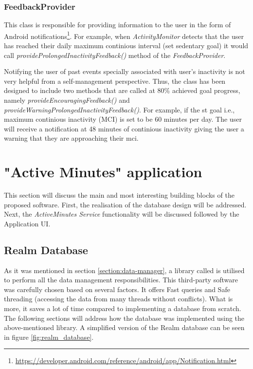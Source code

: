     \subsubsection{FeedbackProvider}
    \label{section:feedback-provider}
    This class is responsible for providing information to the user in the form of Android notifications\footnote{\url{https://developer.android.com/reference/android/app/Notification.html}}. For example, when \textit{ActivityMonitor} detects that the user has reached their daily maximum continious interval (set sedentary goal) it would call \textit{provideProlongedInactivityFeedback()} method of the \textit{FeedbackProvider}.
    
    Notifying the user of past events specially associated with user's inactivity is not very helpful from a self-management perspective. Thus, the class has been designed to include two methods that are called at 80\% achieved goal progress, namely \textit{provideEncouragingFeedback()} and \textit{provideWarningProlongedInactivityFeedback()}. For example, if the \gls{st} goal i.e., maximum continious inactivity (MCI) is set to be 60 minutes per day. The user will receive a notification at 48 minutes of continious inactivity giving the user a warning that they are approaching their \gls{mci}. 

\section{"Active Minutes" application} 
This section will discuss the main and most interesting building blocks of the proposed software. First, the realisation of the database design will be addressed. Next, the \textit{ActiveMinutes Service} functionality will be discussed followed by the Application UI.  
    
    \subsection{Realm Database}
    As it was mentioned in section \ref{section:data-manager}, a library called \citet{realmdatabase_2017} is utilised to perform all the data management responsibilities. This third-party software was carefully chosen based on several factors. It offers Fast queries and Safe threading (accessing the data from many threads without conflicts). What is more, it saves a lot of time compared to implementing a database from scratch. The following sections will address how the database was implemented using the above-mentioned library. A simplified version of the Realm database can be seen in figure \ref{fig:realm_database}. 
    
